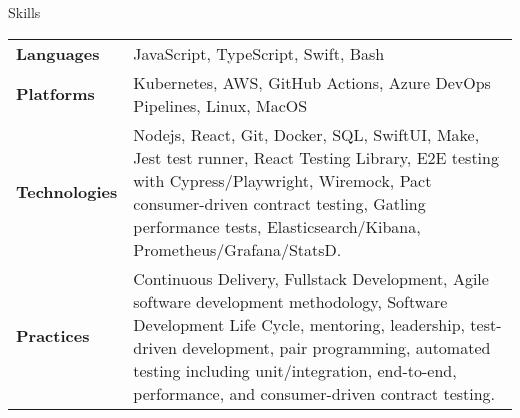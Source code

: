 \begin{section}{Skills}
  \begin{tabularx}{\linewidth}{@{}l X@{}}
    \textbf{Languages} &\small{JavaScript, TypeScript, Swift, Bash} \\
    \textbf{Platforms} &\small{Kubernetes, AWS, GitHub Actions, Azure DevOps Pipelines, Linux, MacOS} \\
    \textbf{Technologies} &\small{Nodejs, React, Git, Docker, SQL, SwiftUI, Make, Jest test runner, React Testing Library, E2E testing with Cypress/Playwright, Wiremock, Pact consumer-driven contract testing, Gatling performance tests, Elasticsearch/Kibana, Prometheus/Grafana/StatsD.} \\
    \textbf{Practices} &\small{Continuous Delivery, Fullstack Development, Agile software development methodology, Software Development Life Cycle, mentoring, leadership, test-driven development, pair programming, automated testing including unit/integration, end-to-end, performance, and consumer-driven contract testing.} \\
  \end{tabularx}
\end{section}
